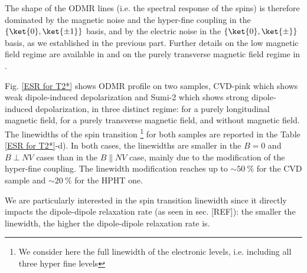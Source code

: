 \documentclass[a4paper,11pt]{report}
\begin{document}
The shape of the ODMR lines (i.e. the spectral response of the spins) is therefore dominated by the magnetic noise and the hyper-fine coupling in the $\{ \ket{0}, \ket{\pm 1} \}$ basis, and by the electric noise in the $\{ \ket{0}, \ket{\pm} \}$ basis, as we established in the previous part. Further details on the low magnetic field regime are available in \citep{jamonneau2016competition} and on the purely transverse magnetic field regime in \citep{qiu2021nuclear, qiu2022nanoscale}.

Fig. \ref{ESR for T2*} shows ODMR profile on two samples, CVD-pink which shows weak dipole-induced depolarization and Sumi-2 which shows strong dipole-induced depolarization, in three distinct regime: for a purely longitudinal magnetic field, for a purely transverse magnetic field, and without magnetic field. The linewidths of the spin transition \footnote{We consider here the full linewidth of the electronic levels, i.e. including all three hyper fine levels} for both samples are reported in the Table \ref{ESR for T2*}-d). In both cases, the linewidths are smaller in the $B=0$ and $B \perp NV$ cases than in the $B \parallel NV$ case, mainly due to the modification of the hyper-fine coupling. The linewidth modification reaches up to $\sim 50\ \%$ for the CVD sample and $\sim 20\ \%$ for the HPHT one.

We are particularly interested in the spin transition linewidth since it directly impacts the dipole-dipole relaxation rate (as seen in sec. [REF]): the smaller the linewidth, the higher the dipole-dipole relaxation rate is.
\end{document}
